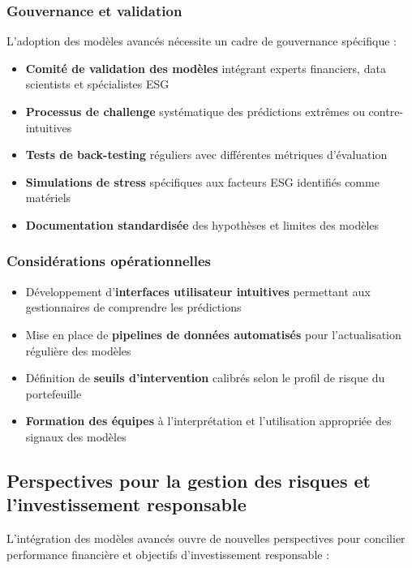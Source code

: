 \subsubsection{Gouvernance et validation}

L'adoption des modèles avancés nécessite un cadre de gouvernance spécifique :

\begin{itemize}
  \item \textbf{Comité de validation des modèles} intégrant experts financiers, data scientists et spécialistes ESG
  \item \textbf{Processus de challenge} systématique des prédictions extrêmes ou contre-intuitives
  \item \textbf{Tests de back-testing} réguliers avec différentes métriques d'évaluation
  \item \textbf{Simulations de stress} spécifiques aux facteurs ESG identifiés comme matériels
  \item \textbf{Documentation standardisée} des hypothèses et limites des modèles
\end{itemize}

\subsubsection{Considérations opérationnelles}

\begin{itemize}
  \item Développement d'\textbf{interfaces utilisateur intuitives} permettant aux gestionnaires de comprendre les prédictions
  \item Mise en place de \textbf{pipelines de données automatisés} pour l'actualisation régulière des modèles
  \item Définition de \textbf{seuils d'intervention} calibrés selon le profil de risque du portefeuille
  \item \textbf{Formation des équipes} à l'interprétation et l'utilisation appropriée des signaux des modèles
\end{itemize}

\subsection{Perspectives pour la gestion des risques et l'investissement responsable}

L'intégration des modèles avancés ouvre de nouvelles perspectives pour concilier performance financière et objectifs d'investissement responsable :

